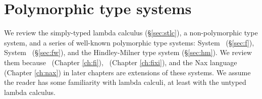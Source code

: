 \chapter{Polymorphic type systems}\label{ch:poly}
We review the simply-typed lambda calculus (\S\ref{sec:stlc}),
a non-polymorphic type system, and
a series of well-known polymorphic type systems:
System \F\ (\S\ref{sec:f}), System \Fw\ (\S\ref{sec:fw}),
and the Hindley-Milner type system (\S\ref{sec:hm}).
We review them because \Fi\ (Chapter \ref{ch:fi}),
\Fixi\ (Chapter \ref{ch:fixi}), and the Nax language (Chapter \ref{ch:nax})
in later chapters are extensions of these systems. We assume the reader has
some familiarity with lambda calculi, at least with the untyped lambda calculus.


